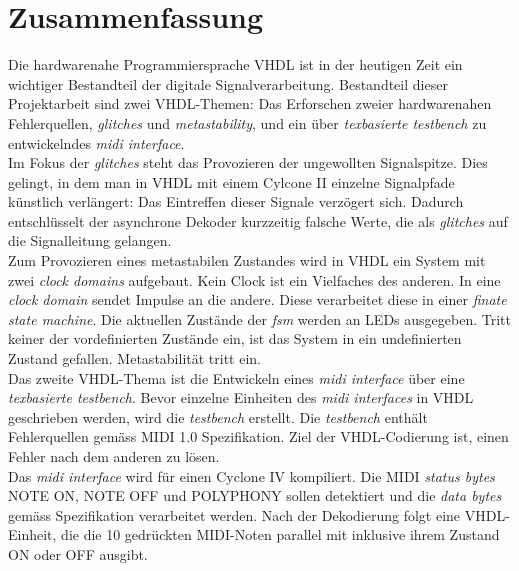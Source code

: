 
\chapter*{Zusammenfassung}

Die hardwarenahe Programmiersprache VHDL ist in der heutigen Zeit ein wichtiger Bestandteil der digitale Signalverarbeitung. Bestandteil dieser Projektarbeit sind zwei VHDL-Themen: Das Erforschen zweier hardwarenahen Fehlerquellen, \textit{glitches} und \textit{metastability}, und ein über \textit{texbasierte testbench} zu entwickelndes \textit{midi interface}.\\

Im Fokus der \textit{glitches} steht das Provozieren der ungewollten Signalspitze. Dies gelingt, in dem man in VHDL mit einem Cylcone II einzelne Signalpfade künstlich verlängert: Das Eintreffen dieser Signale verzögert sich. Dadurch entschlüsselt der asynchrone Dekoder kurzzeitig falsche Werte, die als \textit{glitches} auf die Signalleitung gelangen.\\

Zum Provozieren eines metastabilen Zustandes wird in VHDL ein System mit zwei \textit{clock domains} aufgebaut. Kein Clock ist ein Vielfaches des anderen. In eine \textit{clock domain} sendet Impulse an die andere. Diese verarbeitet diese in einer \textit{finate state machine}. Die aktuellen Zustände der \textit{fsm} werden an LEDs ausgegeben. Tritt keiner der vordefinierten Zustände ein, ist das System in ein undefinierten Zustand gefallen. Metastabilität tritt ein.\\

Das zweite VHDL-Thema ist die Entwickeln eines \textit{midi interface} über eine \textit{texbasierte testbench}. Bevor einzelne Einheiten des \textit{midi interfaces} in VHDL geschrieben werden, wird die \textit{testbench} erstellt. Die \textit{testbench} enthält Fehlerquellen gemäss MIDI 1.0 Spezifikation. Ziel der VHDL-Codierung ist, einen Fehler nach dem anderen zu lösen. \\

Das \textit{midi interface} wird für einen Cyclone IV kompiliert. Die MIDI \textit{status bytes} NOTE ON, NOTE OFF und POLYPHONY sollen detektiert und die \textit{data bytes} gemäss Spezifikation verarbeitet werden. Nach der Dekodierung folgt eine VHDL-Einheit, die die 10 gedrückten MIDI-Noten parallel mit inklusive ihrem Zustand ON oder OFF ausgibt. 





